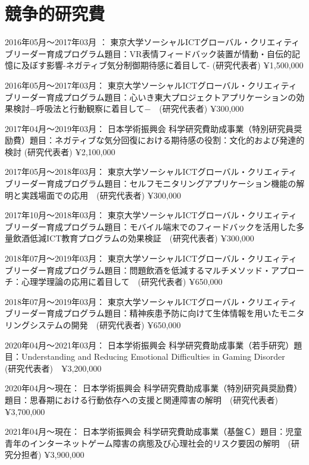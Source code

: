\documentclass{article}
\begin{document}
\section{競争的研究費}
\begin{description}
	\item 2016年05月〜2017年03月	： 東京大学ソーシャルICTグローバル・クリエィティブリーダー育成プログラム題目：VR表情フィードバック装置が情動・自伝的記憶に及ぼす影響-ネガティブ気分制御期待感に着目して- (研究代表者) ¥1,500,000
	\item 2016年05月〜2017年03月： 東京大学ソーシャルICTグローバル・クリエィティブリーダー育成プログラム題目：心いき東大プロジェクトアプリケーションの効果検討−呼吸法と行動観察に着目して−　(研究代表者) ¥300,000
	\item 2017年04月〜2019年03月： 日本学術振興会 科学研究費助成事業（特別研究員奨励費）題目：ネガティブな気分回復における期待感の役割：文化的および発達的検討 (研究代表者) ¥2,100,000
	\item 2017年05月〜2018年03月： 東京大学ソーシャルICTグローバル・クリエィティブリーダー育成プログラム題目：セルフモニタリングアプリケーション機能の解明と実践場面での応用　(研究代表者) ¥300,000
	\item 2017年10月〜2018年03月： 東京大学ソーシャルICTグローバル・クリエィティブリーダー育成プログラム題目：モバイル端末でのフィードバックを活用した多量飲酒低減ICT教育プログラムの効果検証　(研究代表者) ¥300,000
	\item 2018年07月〜2019年03月： 東京大学ソーシャルICTグローバル・クリエィティブリーダー育成プログラム題目：問題飲酒を低減するマルチメソッド・アプローチ：心理学理論の応用に着目して　(研究代表者) ¥650,000
	\item 2018年07月〜2019年03月： 東京大学ソーシャルICTグローバル・クリエィティブリーダー育成プログラム題目：精神疾患予防に向けて生体情報を用いたモニタリングシステムの開発　(研究代表者) ¥650,000
	\item 2020年04月〜2021年03月： 日本学術振興会 科学研究費助成事業（若手研究）題目：Understanding and Reducing Emotional Difficulties in Gaming Disorder　(研究代表者)　¥3,200,000
	\item 2020年04月〜現在： 日本学術振興会 科学研究費助成事業（特別研究員奨励費）題目：思春期における行動依存への支援と関連障害の解明　(研究代表者) ¥3,700,000
	\item 2021年04月〜現在： 日本学術振興会 科学研究費助成事業（基盤Ｃ）題目：児童青年のインターネットゲーム障害の病態及び心理社会的リスク要因の解明　(研究分担者) ¥3,900,000
\end{description}
\end{document}
